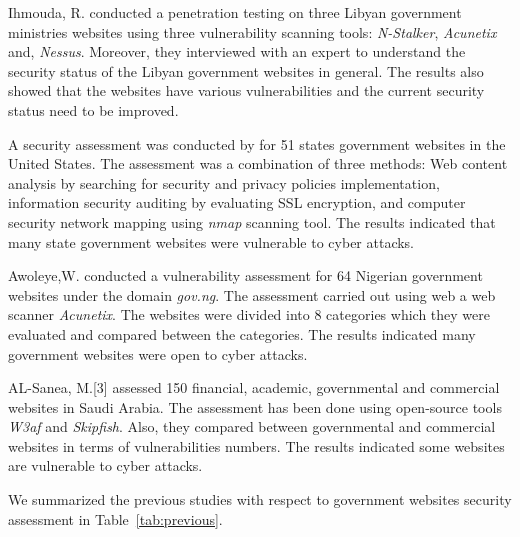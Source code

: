 \documentclass[conference]{IEEEtran}
\begin{document}
Ihmouda, R.\cite{ihmouda2013penetration} conducted a
penetration testing on three Libyan government
ministries websites using three vulnerability
scanning tools: \emph{N-Stalker}, \emph{Acunetix} and, \emph{Nessus}.
Moreover, they interviewed with an expert to understand the security status of the 
Libyan government
websites in general. The results also showed
that the  websites have various
vulnerabilities and the current security status 
need to be improved.

A security assessment was conducted by for 51 states government
websites in the United States\cite{zhao2010opportunities}. The assessment was a
combination of three methods: Web content analysis
by searching for security and privacy policies
implementation, information security auditing by
evaluating SSL encryption, and computer security
network mapping using \emph{nmap} scanning tool. The results indicated that many
state government websites were vulnerable to cyber attacks.

Awoleye,W.\cite{awoleye2012technological}\cite{awoleye2014web} conducted a vulnerability 
assessment for
64 Nigerian government websites under the domain
\emph{gov.ng}. The assessment carried out using web a web scanner \emph{Acunetix}. The websites were divided into 8 categories which
they were evaluated and compared between the
categories. The results indicated many government websites were open to cyber attacks.

AL-Sanea, M.[3]
assessed 150 financial, academic, governmental and
commercial websites in Saudi Arabia. The
assessment has been done using open-source tools
\emph{W3af} and \emph{Skipfish}. Also, they compared between
governmental and commercial websites in terms of
vulnerabilities numbers. The results indicated some websites are vulnerable to cyber attacks.

We summarized the previous studies with respect to government websites security assessment in Table~\ref{tab:previous}.
\end{document}

